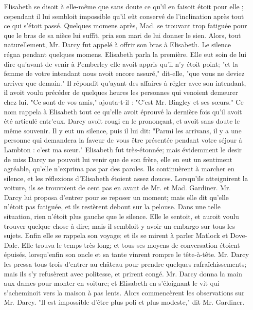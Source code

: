 Elisabeth se disoit à elle-même que sans doute ce qu'il en faisoit étoit pour elle ; cependant il lui sembloit impossible qu'il eût conservé de l'inclination après tout ce qui s'étoit passé. Quelques momens après, Mad. se trouvant trop fatiguée pour que le bras de sa nièce lui suffît, pria son mari de lui donner le sien. Alors, tout naturellement, Mr. Darcy fut appelé à offrir son bras à Elisabeth. Le silence régna pendant\setcounter{page}{111} quelques momens. Elisabeth parla la première. Elle eut soin de lui dire qu'avant de venir à Pemberley elle avoit appris qu'il n'y étoit point; "et la femme de votre intendant nous avoit encore assuré," dit-elle, "que vous ne deviez arriver que demain."
Il répondit qu'ayant des affaires à régler avec son intendant, il avoit voulu précéder de quelques heures les personnes qui venoient demeurer chez lui. "Ce sont de vos amis," ajouta-t-il : "C'est Mr. Bingley et ses sœurs."
Ce nom rappela à Elisabeth tout ce qu'elle avoit éprouvé la dernière fois qu'il avoit été articulé entr'eux. Darcy avoit rougi en le prononçant, et avoit sans doute le même souvenir. Il y eut un silence, puis il lui dit: "Parmi les arrivans, il y a une personne qui demandera la faveur de vous être présentée pendant votre séjour à Lambton : c'est ma sœur." Elisabeth fut très-étonnée; mais évidemment le desir de miss Darcy ne pouvoit lui venir que de son frère, elle en eut un sentiment agréable, qu'elle n'exprima pas par des paroles. Ils continuèrent à marcher en silence, et les réflexions d'Elisabeth étoient assez douces. Lorsqu'ils atteignirent la voiture, ils se trouvoient de cent pas en avant de Mr. et Mad. Gardiner. Mr. Darcy lui proposa d'entrer pour se reposer un moment;\setcounter{page}{112} mais elle dit qu'elle n'étoit pas fatiguée, et ils restèrent debout sur la pelouse. Dans une telle situation, rien n'étoit plus gauche que le silence. Elle le sentoit, et auroit voulu trouver quelque chose à dire; mais il sembloit y avoir un embargo sur tous les sujets. Enfin elle se rappela son voyage; et ils se mirent à parler Matlock et Dove-Dale. Elle trouva le temps très long; et tous ses moyens de conversation étoient épuisés, lorsqu'enfin son oncle et sa tante vinrent rompre le tête-à-tête. Mr. Darcy les pressa tous trois d'entrer au château pour prendre quelques rafraîchissements; mais ils s'y refusèrent avec politesse, et prirent congé. Mr. Darcy donna la main aux dames pour monter en voiture; et Elisabeth en s'éloignant le vit qui s'acheminoit vers la maison à pas lents.
Alors commencèrent les observations sur Mr. Darcy. "Il est impossible d'être plus poli et plus modeste," dit Mr. Gardiner.

